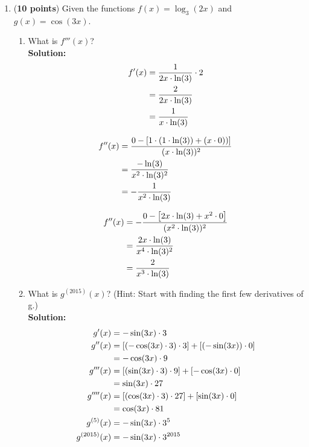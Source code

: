 \documentclass[a4paper]{article}
\begin{document}
\begin{enumerate}
\item (\textbf{10 points}) Given the functions $f(x) = \log_3(2x)$ and $g(x) = \cos(3x)$.


\begin{enumerate}
	\item What is $f'''(x)$?\\
	\textbf{Solution:}\\
	


\begin{align*}
	f'(x) &= \frac{1}{2x \cdot \ln(3)} \cdot 2\notag\\
	&= \frac{2}{2x \cdot \ln(3)}\notag\\
	&= \frac{1}{x \cdot \ln(3)}\notag
\end{align*} 


\begin{align*}
	f''(x) &= \frac{0 - \left[ 1 \cdot (1 \cdot \ln(3)) + (x \cdot 0))\right]}{(x \cdot \ln(3))^2}\notag\\
	&= \frac{-\ln(3)}{x^2 \cdot \ln(3)^2}\notag\\
	&= - \frac{1}{x^2 \cdot \ln(3)}\notag
\end{align*} 
	
\begin{align*}
	f''(x) &= - \frac{0 - \left[ 2x \cdot \ln(3) + x^2 \cdot 0\right]}{(x^2 \cdot \ln(3))^2}\notag\\
	&= \frac{2x \cdot \ln(3)}{x^4 \cdot \ln(3)^2}\notag\\
	&= \frac{2}{x^3 \cdot \ln(3)}\notag
\end{align*}

	
	
	\item What is $g^{(2015)}(x)$? (Hint: Start with finding the first few derivatives of g.)\\
	\textbf{Solution:}\\
	
\begin{align*}
	g'(x) &= -\sin(3x) \cdot 3\notag\\
	g''(x) &= \left[ (-\cos(3x) \cdot 3) \cdot 3\right] + \left[ (-\sin(3x)) \cdot 0 \right]\notag\\
	&= -\cos(3x) \cdot 9\notag\\
	g'''(x) &= \left[ (\sin(3x) \cdot 3) \cdot 9 \right] + \left[ -\cos(3x) \cdot 0\right]\notag\\
	&= \sin(3x) \cdot 27\notag\\
	g''''(x) &= \left[ (\cos(3x) \cdot 3) \cdot 27\right] + \left[ \sin(3x) \cdot 0 \right]\notag\\
	&= \cos(3x) \cdot 81\notag\\
	g^{(5)}(x) &= -\sin(3x) \cdot 3^5\notag\\
	g^{(2015)}(x) &= -\sin(3x) \cdot 3^{2015}\notag
\end{align*}	
	

\end{enumerate}
\end{enumerate}
\end{document}
